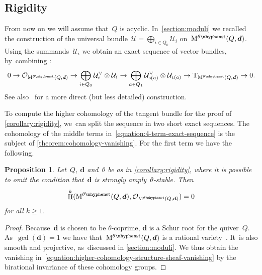 \documentclass[11pt]{article}
\let\ra\rightarrow
\theoremstyle{plain}
\newtheorem{proposition}[theorem]{Proposition}
\theoremstyle{definition}
\DeclareMathOperator\HH{H}
\DeclareMathOperator\source{s}
\DeclareMathOperator\target{t}
\newcommand\stable{\ensuremath{\mhyphen\mathrm{st}}}
\newcommand\tangent{\ensuremath{\mathrm{T}}}
\newcommand\tuple[1]{\ensuremath{{\boldsymbol{#1}}}}
\begin{document}
\subsection{Rigidity}
\label{subsection:rigidity}
From now on we will assume that~$Q$ is acyclic. In~\cref{section:moduli} we recalled the construction of the universal bundle~$\mathcal{U}=\bigoplus_{i\in Q_0}\mathcal{U}_i$
on~$\modulispace[\theta\stable]{Q,\tuple{d}}$.
\hbox{Using} the summands~$\mathcal{U}_i$ we obtain an exact sequence of vector bundles, by~combining \hbox{\cite[Prop.\,3.3 \& Prop.\,3.7]{MR4770368}}:
\begin{equation}
\label{equation:4-term-exact-sequence}
0
\ra\mathcal{O}_{\modulispace[\theta\stable]{Q,\tuple{d}}}
\to\bigoplus_{i \in Q_0} \mathcal{U}^\vee_i \otimes \mathcal{U}_i
\to\bigoplus_{a \in Q_1} \mathcal{U}^\vee_{\source(a)} \otimes \mathcal{U}_{\target(a)}
\to\tangent_{\modulispace[\theta\stable]{Q,\tuple{d}}}
\ra0.
\end{equation}
See also~\cite[\S 4.1]{MR4352662} for a more direct (but less detailed) construction.

To compute the higher cohomology of the tangent bundle for the proof of \cref{corollary:rigidity}, we~can split the sequence in two short exact sequences.
The cohomology of the middle terms in~\eqref{equation:4-term-exact-sequence}
is the subject of \cref{theorem:cohomology-vanishing}.
For the first term we have the following.

\begin{proposition}
Let~$Q$, $\tuple{d}$ and~$\theta$ be as in \cref{corollary:rigidity},
where it is possible to omit the condition that~$\tuple{d}$ is strongly amply~$\theta$-stable.
Then
\begin{equation}
\label{equation:higher-cohomology-structure-sheaf-vanishing}
\HH^k(\modulispace[\theta\stable]{Q,\tuple{d}},\mathcal{O}_{\modulispace[\theta\stable]{Q,\tuple{d}}}) = 0
\end{equation}
for all $k \geq 1$.
\end{proposition}

\begin{proof}
Because~$\tuple{d}$ is chosen to be $\theta$-coprime,
$\tuple{d}$ is a Schur root for the quiver~$Q$.
As~$\gcd(\tuple{d}) = 1$
we have that~$\modulispace[\theta\stable]{Q,\tuple{d}}$ is a rational variety~\cite[Th.\,6.4]{MR1914089}. It~is also smooth and projective, as~discussed in \cref{section:moduli}.
We thus obtain the vanishing in~\eqref{equation:higher-cohomology-structure-sheaf-vanishing}
by the birational invariance of these cohomology groups.
\end{proof}
\end{document}
